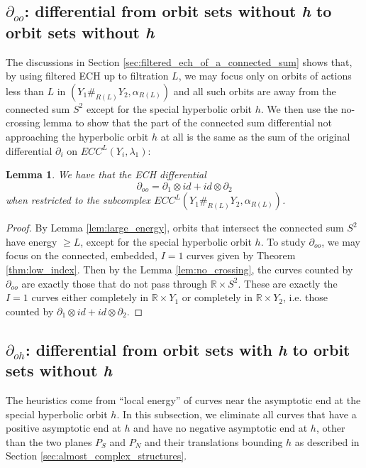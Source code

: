 \documentclass{article}
\numberwithin{equation}{section}
\newtheorem{lemma}[theorem]{Lemma}
\theoremstyle{definition}
\begin{document}
\subsection{\texorpdfstring{$\partial_{oo}$}{diff oo}: differential from orbit sets without \emph{h} to orbit sets without \emph{h}}
The discussions in Section \ref{sec:filtered_ech_of_a_connected_sum} shows that, by using filtered ECH up to filtration $L$, we may focus only on orbits of actions less than $L$ in $(Y_1 \#_{R(L)} Y_2, \alpha_{R(L)})$ and all such orbits are away from the connected sum $S^2$ except for the special hyperbolic orbit $h$. We then use the no-crossing lemma to show that the part of the connected sum differential not approaching the hyperbolic orbit $h$ at all is the same as the sum of the original differential $\partial_i$ on $ECC^L(Y_i, \lambda_1)$:
\begin{lemma}
\label{lem:L_oo}
We have that the ECH differential 
$$\partial_{oo} = \partial_1 \otimes id + id \otimes \partial_2$$ 
when restricted to the subcomplex $ECC^L(Y_1 \#_{R(L)} Y_2, \alpha_{R(L)})$.
\end{lemma}
\begin{proof}
By Lemma \ref{lem:large_energy}, orbits that intersect the connected sum $S^2$ have energy $\geq L$, except for the special hyperbolic orbit $h$. To study $\partial_{oo}$, we may focus on the connected, embedded, $I=1$ curves given by Theorem \ref{thm:low_index}. Then by the Lemma \ref{lem:no_crossing}, the curves counted by $\partial_{oo}$ are exactly those that do not pass through $\mathbb{R} \times S^2$. These are exactly the $I=1$ curves either completely in $\mathbb{R}\times Y_1$ or completely in $\mathbb{R}\times Y_2$, i.e. those counted by $\partial_1 \otimes id + id \otimes \partial_2$.
\end{proof}

\subsection{\texorpdfstring{$\partial_{oh}$}{diff oh}: differential from orbit sets with \emph{h} to orbit sets without \emph{h}}
The heuristics come from ``local energy'' of curves near the asymptotic end at the special hyperbolic orbit $h$. In this subsection, we eliminate all curves that have a positive asymptotic end at $h$ and have no negative asymptotic end at $h$, other than the two planes $P_S$ and $P_N$ and their translations bounding $h$ as described in Section \ref{sec:almost_complex_structures}.
\end{document}
